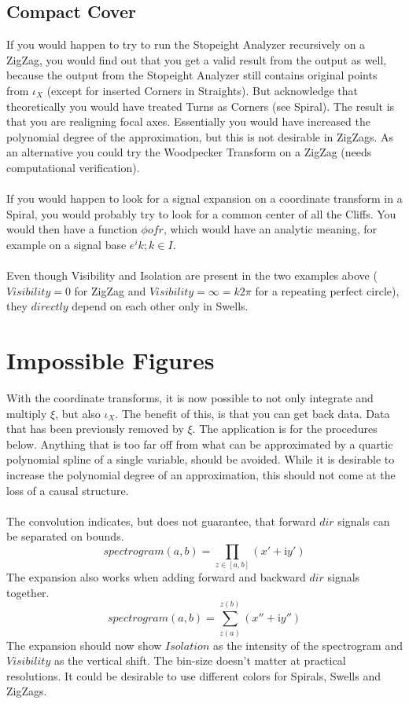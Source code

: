 \documentclass{report}
\begin{document}
\subsection*{Compact Cover}

If you would happen to try to run the Stopeight Analyzer recursively on a ZigZag, you would find out that you get a valid result from the output as well, because the output from the Stopeight Analyzer still contains original points from $\iota_{X}$ (except for inserted Corners in Straights). But acknowledge that theoretically you would have treated Turns as Corners (see Spiral). The result is that you are realigning focal axes. Essentially you would have increased the polynomial degree of the approximation, but this is not desirable in ZigZags. As an alternative you could try the Woodpecker Transform on a ZigZag (needs computational verification).\\\\
If you would happen to look for a signal expansion on a coordinate transform in a Spiral, you would probably try to look for a common center of all the Cliffs. You would then have a function $\phi of r$, which would have an analytic meaning, for example on a signal base $e^ik;k \in I$.\\\\
Even though Visibility and Isolation are present in the two examples above ($Visibility=0$ for ZigZag and $Visibility=\infty=k2\pi$ for a repeating perfect circle), they $directly$ depend on each other only in Swells.

\section{Impossible Figures}

With the coordinate transforms, it is now possible to not only integrate and multiply $\xi$, but also $\iota_{X}$. The benefit of this, is that you can get back data. Data that has been previously removed by $\xi$. The application is for the procedures below. Anything that is too far off from what can be approximated by a quartic polynomial spline of a single variable, should be avoided. While it is desirable to increase the polynomial degree of an approximation, this should not come at the loss of a causal structure.\\\\
The convolution indicates, but does not guarantee, that forward $dir$ signals can be separated on bounds.
\begin{equation}
spectrogram(a,b)=\prod \limits _{z \in [a,b]} (x'+\mathrm{i}y')
\end{equation}
The expansion also works when adding forward and backward $dir$ signals together.
\begin{equation}
spectrogram(a,b)=\sum \limits _{z(a)}^{z(b)} (x''+\mathrm{i}y'')
\end{equation}
The expansion should now show $Isolation$ as the intensity of the spectrogram and $Visibility$ as the vertical shift. The bin-size doesn't matter at practical resolutions. It could be desirable to use different colors for Spirals, Swells and ZigZags.
\end{document}
